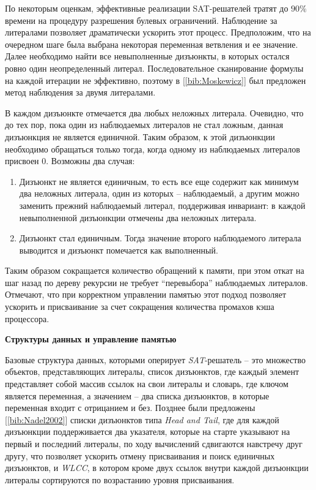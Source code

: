 По некоторым оценкам, эффективные реализации SAT-решателей тратят до $90\%$ времени на процедуру разрешения булевых ограничений. Наблюдение за литералами позволяет драматически ускорить этот процесс. Предположим, что на очередном шаге была выбрана некоторая переменная ветвления и ее значение. Далее необходимо найти все невыполненные дизъюнкты, в которых остался ровно один неопределенный литерал. Последовательное сканирование формулы на каждой итерации не эффективно, поэтому в [\ref{bib:Moskewicz}] был предложен метод наблюдения за двумя литералами.

В каждом дизъюнкте отмечается два любых неложных литерала. Очевидно, что до тех пор, пока один из наблюдаемых литералов не стал ложным, данная дизъюнкция не является единичной. Таким образом, к этой дизъюнкции необходимо обращаться только тогда, когда одному из наблюдаемых литералов присвоен $0$. Возможны два случая:

\begin{enumerate}[leftmargin=1cm,topsep=0pt,itemsep=-1ex,partopsep=1ex,parsep=1ex,label=\arabic{*}.]

\item Дизъюнкт не является единичным, то есть все еще содержит как минимум два неложных литерала, один из которых – наблюдаемый, а другим можно заменить прежний наблюдаемый литерал, поддерживая инвариант: в каждой невыполненной дизъюнкции отмечены два неложных литерала.

\item Дизъюнкт стал единичным. Тогда значение второго наблюдаемого литерала выводится и дизъюнкт помечается как выполненный.

\end{enumerate}

Таким образом сокращается количество обращений к памяти, при этом откат на шаг назад по дереву рекурсии не требует \enquote{перевыбора} наблюдаемых литералов. Отмечают, что при корректном управлении памятью этот подход позволяет ускорить и присваивание за счет сокращения количества промахов кэша процессора.

\textbf{Структуры данных и управление памятью}

Базовые структура данных, которыми оперирует \textit{SAT}-решатель – это множество объектов, представляющих литералы, список дизъюнктов, где каждый элемент представляет собой массив ссылок на свои литералы и словарь, где ключом является переменная, а значением – два списка дизъюнктов, в которые переменная входит с отрицанием и без. Позднее были предложены [\ref{bib:Nadel2002}] списки дизъюнктов типа \textit{Head and Tail}, где для каждой дизъюнкции поддерживается два указателя, которые на старте указывают на первый и последний литералы, по ходу вычислений сдвигаются навстречу друг другу, что позволяет ускорить отмену присваивания и поиск единичных дизъюнктов, и \textit{WLCC}, в котором кроме двух ссылок внутри каждой дизъюнкции литералы сортируются по возрастанию уровня присваивания.


